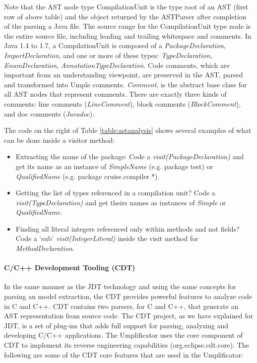 Note that the AST node type CompilationUnit is the type root of an AST (first row of above table) and the object returned by the ASTParser after completion of the parsing a Java file. The source range for the CompilationUnit type node is the entire source file, including leading and trailing whitespace and comments. In Java 1.4 to 1.7, a CompilationUnit is composed of 
a \textit{PackageDeclaration}, \textit{ImportDeclaration}, and one or more of these types:  \textit{TypeDeclaration}, \textit{EnumDeclaration}, \textit{AnnotationTypeDeclaration}. 
Code comments, which are important from an understanding viewpoint, are preserved in the AST, parsed and transformed into Umple comments. \textit{Comment}, is the abstract base class for all AST nodes that represent comments. There are exactly three kinds of comments: line comments (\textit{LineComment}), block comments (\textit{BlockComment}), and doc comments (\textit{Javadoc}).

The code on the right of Table \ref{table:astanalysis} shows several examples of what can be done inside a visitor method:

\begin{itemize}
\item Extracting the name of the package: Code a \textit{visit(PackageDeclaration)} and get its name as an instance of \textit{SimpleName} (e.g. package test)  or \textit{QualifiedName} (e.g. package cruise.compiler.*).
\item Getting the list of types referenced in a compilation unit? Code a \textit{visit(TypeDeclaration)} and get theirs names as instances of \textit{Simple} or \textit{QualifiedName}.
\item Finding all literal integers referenced only within methods and not fields? Code a `sub' \textit{visit(IntegerLiteral)} inside the visit method for \textit{MethodDeclaration}.
\end{itemize}

\paragraph*{C/C++ Development Tooling (CDT)}

In the same manner as the JDT technology and using the same concepts for parsing an model extraction, the CDT provides powerful features to analyze code in C and C++. CDT contains two parsers, for C and C++, that generate an AST representation from source code. The CDT project, as we have explained for JDT, is a set of plug-ins that adds full support for parsing, analyzing and developing C/C++ applications. The Umplificator uses the core component of CDT to implement its reverse engineering capabilities (org.eclipse.cdt.core). The following are some of the CDT core features that are used in the Umplificator:

